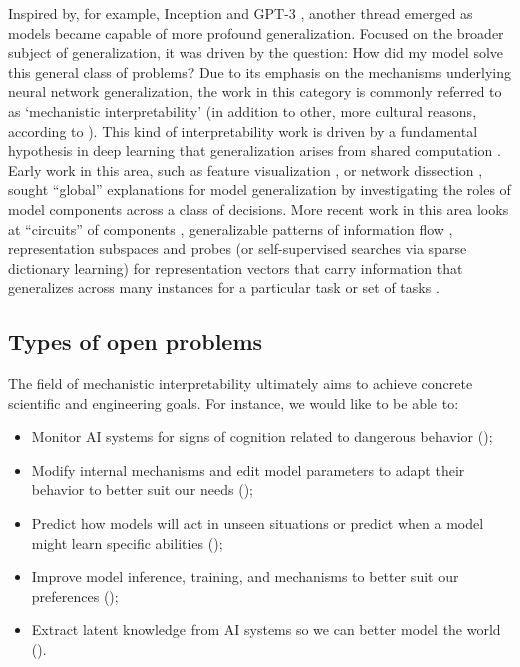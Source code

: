 Inspired by, for example, Inception \citep{szegedy2015inception} and GPT-3 \citep{Brown_2020_GPT3}, another thread emerged as models became capable of more profound generalization. Focused on the broader subject of generalization, it was driven by the question: How did my model solve this general class of problems? Due to its emphasis on the mechanisms underlying neural network generalization, the work in this category is commonly referred to as `mechanistic interpretability' (in addition to other, more cultural reasons, according to \citep{saphra2024mechanistic}). This kind of interpretability work is driven by a fundamental hypothesis in deep learning that generalization arises from shared computation \citep{LeCun_2015_DeepLearning}. Early work in this area, such as feature visualization \citep{olah2017feature}, or network dissection \citep{Bau_2017_NetworkDissection}, sought “global” explanations for model generalization by investigating the roles of model components across a class of decisions. More recent work in this area looks at “circuits” of components \citep{Wang_2022_Circuits}, generalizable patterns of information flow \citep{Geva_2023_InformationFlow}, representation subspaces
\citep{geiger2024findingalignmentsinterpretablecausal,zou2023representationengineeringtopdownapproach} and probes (or self-supervised searches via sparse dictionary learning) for representation vectors that carry information that generalizes across many instances for a particular task or set of tasks 
\citep{cunningham2023sparseautoencodershighlyinterpretable,Bricken_2023_dictionary,Todd_2024_Probe,Tigges_2023_Probe}.

\subsection{Types of open problems}
\label{subsec:types-of-open-problems}


The field of mechanistic interpretability ultimately aims to achieve concrete scientific and engineering goals. For instance, we would like to be able to:
\begin{itemize}
    \item Monitor AI systems for signs of cognition related to dangerous behavior ();
    \item Modify internal mechanisms and edit model parameters to adapt their behavior to better suit our needs ();
    \item Predict how models will act in unseen situations or predict when a model might learn specific abilities ();
    \item Improve model inference, training, and mechanisms to better suit our preferences ();
    \item Extract latent knowledge from AI systems so we can better model the world ().
\end{itemize}

